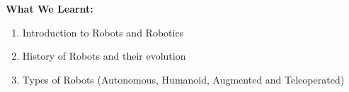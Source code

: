 \documentclass[12pt]{article}
\begin{document}

\vspace{2em}
{\huge \textbf{What We Learnt:}}
\vspace{1em}
\begin{enumerate}
    \item Introduction to Robots and Robotics
    \item History of Robots and their evolution
    \item Types of Robots (Autonomous, Humanoid, Augmented and Teleoperated)
\end{enumerate}

\end{document}
